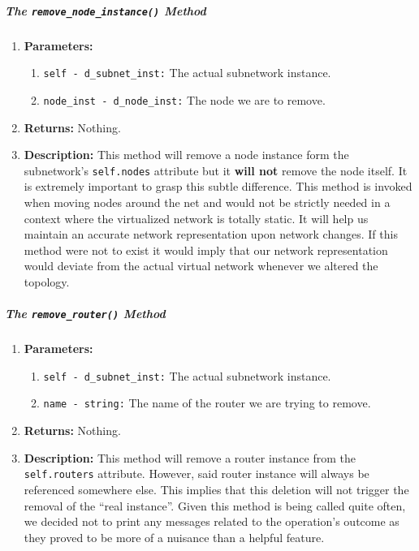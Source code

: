         \subparagraph{The \texttt{remove\_node\_instance()} Method}
            \begin{enumerate}
                \item \textbf{Parameters:}
                \begin{enumerate}
                    \item \texttt{self - d\_subnet\_inst:} The actual subnetwork instance.
                    \item \texttt{node\_inst - d\_node\_inst:} The node we are to remove.
                \end{enumerate}
                \item \textbf{Returns:} Nothing.
                \item \textbf{Description:} This method will remove a node instance form the subnetwork's \texttt{self.nodes} attribute but it \textbf{will not} remove the node itself. It is extremely important to grasp this subtle difference. This method is invoked when moving nodes around the net and would not be strictly needed in a context where the virtualized network is totally static. It will help us maintain an accurate network representation upon network changes. If this method were not to exist it would imply that our network representation would deviate from the actual virtual network whenever we altered the topology.
            \end{enumerate}

        \subparagraph{The \texttt{remove\_router()} Method}
            \begin{enumerate}
                \item \textbf{Parameters:}
                \begin{enumerate}
                    \item \texttt{self - d\_subnet\_inst:} The actual subnetwork instance.
                    \item \texttt{name - string:} The name of the router we are trying to remove.
                \end{enumerate}
                \item \textbf{Returns:} Nothing.
                \item \textbf{Description:} This method will remove a router instance from the \texttt{self.routers} attribute. However, said router instance will always be referenced somewhere else. This implies that this deletion will not trigger the removal of the ``real instance''. Given this method is being called quite often, we decided not to print any messages related to the operation's outcome as they proved to be more of a nuisance than a helpful feature.
            \end{enumerate}

